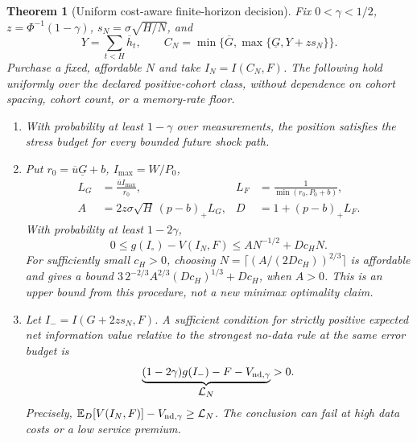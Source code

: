 \documentclass[12pt]{article}
\newtheorem{theorem}{Theorem}[section]
\theoremstyle{definition}
\theoremstyle{remark}
\begin{document}
\begin{theorem}[Uniform cost-aware finite-horizon decision]\label{fhc:decision}
Fix $0<\gamma<1/2$, $z=\Phi^{-1}(1-\gamma)$,
$s_N=\sigma\sqrt{H/N}$, and
\[
 Y=\sum_{t<H}\overline h_t,\qquad
 C_N=\min\{\overline G,\max\{\underline G,Y+zs_N\}\}.
\]
Purchase a fixed, affordable $N$ and take $I_N=I(C_N,F)$.
The following hold uniformly over the declared positive-cohort class,
without dependence on cohort spacing, cohort count, or a memory-rate floor.
\begin{enumerate}
\item With probability at least $1-\gamma$ over measurements, the position
      satisfies the stress budget for \emph{every} bounded future shock path.
\item Put $r_0=\overline u\underline G+b$, $I_{\max}=W/P_0$,
\[
 \begin{aligned}
 L_G&=\frac{\overline u I_{\max}}{r_0}, &
 L_F&=\frac{1}{\min(r_0,P_0+b)},\\
 A&=2z\sigma\sqrt H\,(p-b)_+L_G, & D&=1+(p-b)_+L_F.
 \end{aligned}
\]
With probability at least $1-2\gamma$,
\[
 0\le g(I_\circ)-V(I_N,F)\le A N^{-1/2}+D c_HN.
\]
For sufficiently small $c_H>0$, choosing
$N=\lceil(A/(2Dc_H))^{2/3}\rceil$ is affordable and gives a bound
$3\,2^{-2/3}A^{2/3}(Dc_H)^{1/3}+Dc_H$, when $A>0$.
This is an upper bound from this procedure, not a new minimax optimality claim.
\item Let $I_-=I(G+2zs_N,F)$. A sufficient condition for strictly positive
      expected net information value relative to the strongest no-data rule
      at the \emph{same} error budget is
\[
 \underbrace{(1-2\gamma)g(I_-)-F-V_{{\rm nd},\gamma}}_{\displaystyle\mathcal L_N}>0.
\]
Precisely, $\mathbb E_D[V(I_N,F)]-V_{{\rm nd},\gamma}\ge\mathcal L_N$.
The conclusion can fail at high data costs or a low service premium.
\end{enumerate}
\end{theorem}
\end{document}
